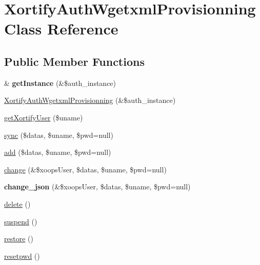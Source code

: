 \hypertarget{class_xortify_auth_wgetxml_provisionning}{\section{Xortify\-Auth\-Wgetxml\-Provisionning Class Reference}
\label{class_xortify_auth_wgetxml_provisionning}
}
\subsection*{Public Member Functions}
\begin{DoxyCompactItemize}
\item 
\hypertarget{class_xortify_auth_wgetxml_provisionning_a2c8eaa915c70d75289ac8a03686194f9}{\& {\bfseries get\-Instance} (\&\$auth\-\_\-instance)}\label{class_xortify_auth_wgetxml_provisionning_a2c8eaa915c70d75289ac8a03686194f9}

\item 
\hyperlink{class_xortify_auth_wgetxml_provisionning_a19fcb3e96d11cb81e368ba658ee38dfb}{Xortify\-Auth\-Wgetxml\-Provisionning} (\&\$auth\-\_\-instance)
\item 
\hyperlink{class_xortify_auth_wgetxml_provisionning_a041d726ac26672547ed1504e8e0117aa}{get\-Xortify\-User} (\$uname)
\item 
\hyperlink{class_xortify_auth_wgetxml_provisionning_a35dc08b0f2138eb818ff95345b73bcff}{sync} (\$datas, \$uname, \$pwd=null)
\item 
\hyperlink{class_xortify_auth_wgetxml_provisionning_adfc9fcef01e7bd7b2f47e8e79d51fc63}{add} (\$datas, \$uname, \$pwd=null)
\item 
\hyperlink{class_xortify_auth_wgetxml_provisionning_ae1f0971b9712c794620cf309164e43af}{change} (\&\$xoops\-User, \$datas, \$uname, \$pwd=null)
\item 
\hypertarget{class_xortify_auth_wgetxml_provisionning_a94f4e0408f26e65abca347ec883f4ec9}{{\bfseries change\-\_\-json} (\&\$xoops\-User, \$datas, \$uname, \$pwd=null)}\label{class_xortify_auth_wgetxml_provisionning_a94f4e0408f26e65abca347ec883f4ec9}

\item 
\hyperlink{class_xortify_auth_wgetxml_provisionning_a13bdffdd926f26b825ea57066334ff01}{delete} ()
\item 
\hyperlink{class_xortify_auth_wgetxml_provisionning_ad73006a505121228f3b075c2409787d2}{suspend} ()
\item 
\hyperlink{class_xortify_auth_wgetxml_provisionning_aa1371f22826cf8cde4454c9b467203d0}{restore} ()
\item 
\hyperlink{class_xortify_auth_wgetxml_provisionning_a06d70fbd3a2db390b6f2530c0076628e}{resetpwd} ()
\end{DoxyCompactItemize}
